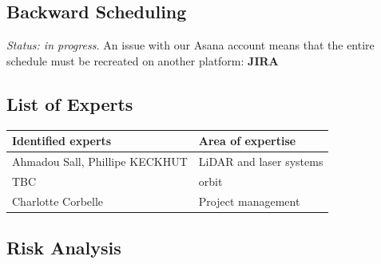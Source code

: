 \documentclass[12pt,a4paper]{article}
\begin{document}
\subsection{Backward Scheduling}

\textit{Status: in progress.}
An issue with our Asana account means that the entire schedule must be recreated
on another platform: \textbf{JIRA}



\subsection{List of Experts}

\begin{tabularx}{\textwidth}{@{}lY@{}}
\toprule
\textbf{Identified experts} & \textbf{Area of expertise} \\
\midrule
Ahmadou Sall, Phillipe KECKHUT & LiDAR and laser systems\\
TBC & orbit \\
Charlotte Corbelle & Project management\\
\bottomrule
\end{tabularx}

\subsection{Risk Analysis}
\end{document}
